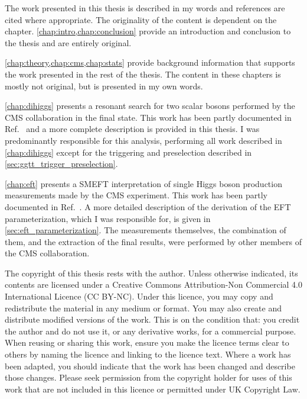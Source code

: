 
The work presented in this thesis is described in my words and references are cited where appropriate. The originality of the content is dependent on the chapter. \cref{chap:intro,chap:conclusion} provide an introduction and conclusion to the thesis and are entirely original.

\cref{chap:theory,chap:cms,chap:stats} provide background information that supports the work presented in the rest of the thesis. The content in these chapters is mostly not original, but is presented in my own words. 

\cref{chap:dihiggs} presents a resonant search for two scalar bosons performed by the CMS collaboration in the \ggtt final state. This work has been partly documented in Ref.~\cite{CMS:2025tqi} and a more complete description is provided in this thesis. I was predominantly responsible for this analysis, performing all work described in \cref{chap:dihiggs} except for the triggering and preselection described in \cref{sec:ggtt_trigger_preselection}.

\cref{chap:eft} presents a SMEFT interpretation of single Higgs boson production measurements made by the CMS experiment. This work has been partly documented in Ref.~\cite{CMS-PAS-HIG-21-018}. A more detailed description of the derivation of the EFT parameterization, which I was responsible for, is given in \cref{sec:eft_parameterization}. The measurements themselves, the combination of them, and the extraction of the final results, were performed by other members of the CMS collaboration. 


The copyright of this thesis rests with the author. Unless otherwise indicated, its contents are licensed under a Creative Commons Attribution-Non Commercial 4.0 International Licence (CC BY-NC). Under this licence, you may copy and redistribute the material in any medium or format. You may also create and distribute modified versions of the work. This is on the condition that: you credit the author and do not use it, or any derivative works, for a commercial purpose. When reusing or sharing this work, ensure you make the licence terms clear to others by naming the licence and linking to the licence text. Where a work has been adapted, you should indicate that the work has been changed and describe those changes. Please seek permission from the copyright holder for uses of this work that are not included in this licence or permitted under UK Copyright Law.

